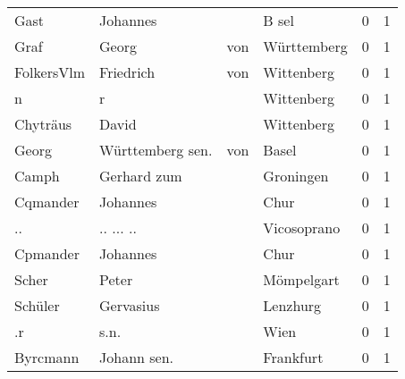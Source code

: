 \begin{tabular}{llllrr}
                     Gast &                           Johannes &             &                                       B sel &          0 &         1 \\
                     Graf &                              Georg &         von &                                 Württemberg &          0 &         1 \\
               FolkersVlm &                          Friedrich &         von &                                  Wittenberg &          0 &         1 \\
                        n &                                  r &             &                                  Wittenberg &          0 &         1 \\
                 Chyträus &                              David &             &                                  Wittenberg &          0 &         1 \\
                    Georg &                   Württemberg sen. &         von &                                       Basel &          0 &         1 \\
                    Camph &                        Gerhard zum &             &                                   Groningen &          0 &         1 \\
                 Cqmander &                           Johannes &             &                                        Chur &          0 &         1 \\
                       .. &                          .. ... .. &             &                                 Vicosoprano &          0 &         1 \\
                 Cpmander &                           Johannes &             &                                        Chur &          0 &         1 \\
                    Scher &                              Peter &             &                                  Mömpelgart &          0 &         1 \\
                  Schüler &                          Gervasius &             &                                    Lenzhurg &          0 &         1 \\
                       .r &                               s.n. &             &                                        Wien &          0 &         1 \\
                 Byrcmann &                        Johann sen. &             &                                   Frankfurt &          0 &         1 \\

\end{tabular}
